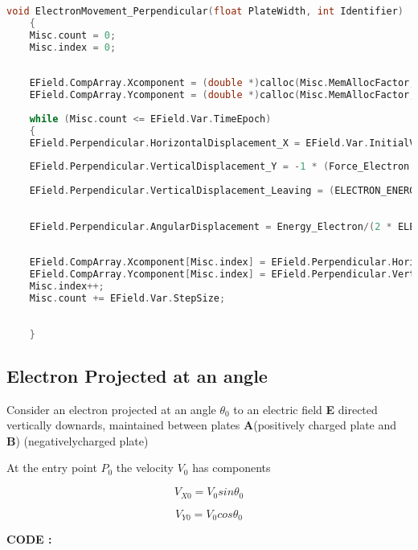 \documentclass[a4paper,20pt,twoside]{report}
\begin{document}
	\begin{lstlisting}[language = C]
	void ElectronMovement_Perpendicular(float PlateWidth, int Identifier)
	{		
	Misc.count = 0;
	Misc.index = 0;
	
	
	EField.CompArray.Xcomponent = (double *)calloc(Misc.MemAllocFactor, sizeof(double));
	EField.CompArray.Ycomponent = (double *)calloc(Misc.MemAllocFactor, sizeof(double));
	
	while (Misc.count <= EField.Var.TimeEpoch)
	{
	EField.Perpendicular.HorizontalDisplacement_X = EField.Var.InitialVelocity * Misc.count;
	
	EField.Perpendicular.VerticalDisplacement_Y = -1 * (Force_Electron / 2 * ELECTRON_MASS) * pow(Misc.count,2);
	
	EField.Perpendicular.VerticalDisplacement_Leaving = (ELECTRON_ENERGY / 2 * ELECTRON_MASS) * Energy_Electron * (PlateWidth / pow(EField.Var.InitialVelocity, 2));
	
	
	EField.Perpendicular.AngularDisplacement = Energy_Electron/(2 * ELECTRON_MASS * EField.Var.InitialVelocity) * pow(EField.Perpendicular.HorizontalDisplacement_X,2);
	
	
	EField.CompArray.Xcomponent[Misc.index] = EField.Perpendicular.HorizontalDisplacement_X;
	EField.CompArray.Ycomponent[Misc.index] = EField.Perpendicular.VerticalDisplacement_Y;
	Misc.index++;
	Misc.count += EField.Var.StepSize;
	
	
	}
	\end{lstlisting}
	
	\subsection{Electron Projected at an angle}
	Consider an electron projected at an angle $\theta_0$ to an electric field \textbf{E} 
	directed vertically downards, maintained between plates 
	\textbf{A}(positively charged plate and \textbf{B}) (negativelycharged plate)
		
		At the entry point $P_0$ the velocity $V_0$ has components 
		
		\begin{equation}
		V_{X0} = V_0 sin\theta_0 %
		\end{equation}
		
		\begin{equation}
		V_{Y0} = V_0 cos\theta_0
		\end{equation}
	
	\textbf{CODE : }
	
\end{document}
